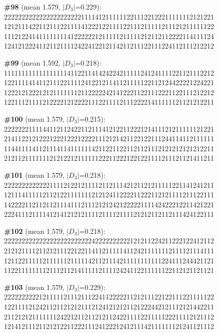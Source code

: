 \documentclass[10pt]{article}
\begin{document}
\noindent\textbf{\#98} (mean 1.579, $|D_3|$=0.229):\\
222222222222222222222211114121111112211122122211111112121221\\
121211142211211122111141222122111122111211111211121211111122\\
111212241411111111412222221211111211111212112112222114111124\\
124121222411211211112422412212114211211122111224112111212212\medskip

\noindent\textbf{\#99} (mean 1.592, $|D_3|$=0.218):\\
111111111111111111411221141424224211111241241111221121112212\\
122111141411211122111124122121141121111122112124422221224221\\
122212122212121111111211222224214122211221112221122111212212\\
122111211112122221212222111221111211122221411111121121212211\medskip

\noindent\textbf{\#100} (mean 1.579, $|D_3|$=0.215):\\
222222211114411211242211211141212211222121411121211111121221\\
214112212122212221222122221112121421122122111244114112111111\\
114411114112111411411111142112211221121121112121212121212211\\
212112111111121212212111111222112221221221111211121121411211\medskip

\noindent\textbf{\#101} (mean 1.579, $|D_3|$=0.218):\\
222222222222211112122121111211211142121121211111221141241211\\
121114111112112122111111121212411222211222112121111211122111\\
142222112112112111411121112121242122222111142422212211421221\\
222411121111412141212121111211112111121212112112111424122111\medskip

\noindent\textbf{\#102} (mean 1.579, $|D_3|$=0.218):\\
222222222222222222222222242222222222121211224211222122412112\\
212121111211212111221221141121111141124211111112111121114111\\
121122111112111111211111421121114211111111111224111244421121\\
112211111111211121121411111211112424112211111122112121121121\medskip

\noindent\textbf{\#103} (mean 1.579, $|D_3|$=0.229):\\
222222222212111112111211122411222221121211122122111221111122\\
122111121242112112121211121241212121121222442121112121442211\\
211212121111111242212112112121124221111221111122211112121112\\
121412111211212122112221112412221241211142111111121241121112\medskip
\end{document}
